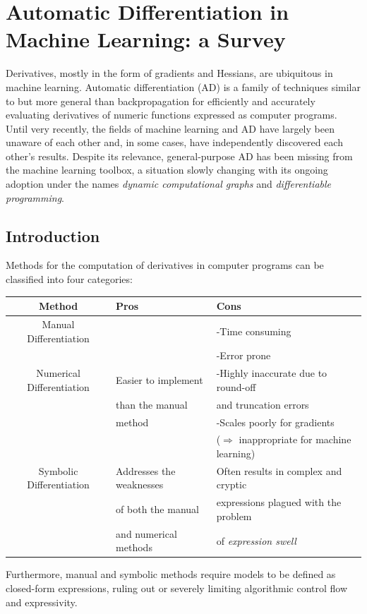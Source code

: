 \section{Automatic Differentiation in Machine Learning: a Survey}
Derivatives, mostly in the form of gradients and Hessians, are ubiquitous in machine learning. Automatic differentiation (AD) is a family of techniques similar to but more general than backpropagation for efficiently and accurately evaluating derivatives of numeric functions expressed as computer programs. Until
very recently, the fields of machine learning and AD have largely been unaware of each other and, in some cases, have independently discovered each other’s results. Despite its relevance, general-purpose AD has been missing from the machine learning toolbox, a situation slowly changing with its ongoing adoption under the names \emph{dynamic computational graphs} and \emph{differentiable programming}.

\subsection{Introduction}
Methods for the computation of derivatives in computer programs can be classified into four categories:
\begin{center}
\begin{tabular}{ |c|l|l| } 
\hline
 Method & Pros & Cons\\
\hline
 Manual Differentiation & & -Time consuming \\ 
 & & -Error prone\\ \hline
 Numerical Differentiation& Easier to implement & -Highly inaccurate due to round-off\\
 & than the manual  & and truncation errors\\
 & method & -Scales poorly for gradients\\ 
 & & ($\Rightarrow$ inappropriate for machine learning) \\ \hline
 Symbolic Differentiation & Addresses the weaknesses & Often results in complex and cryptic  \\ 
 & of both the manual & expressions plagued with the problem \\ 
 & and  numerical methods & of \emph{expression swell}\\ \hline
\end{tabular}
\end{center}
\vspace{5mm}
\noindent Furthermore, manual and symbolic methods require models to be defined as closed-form expressions, ruling out or severely limiting algorithmic control flow and expressivity.
\newline 

